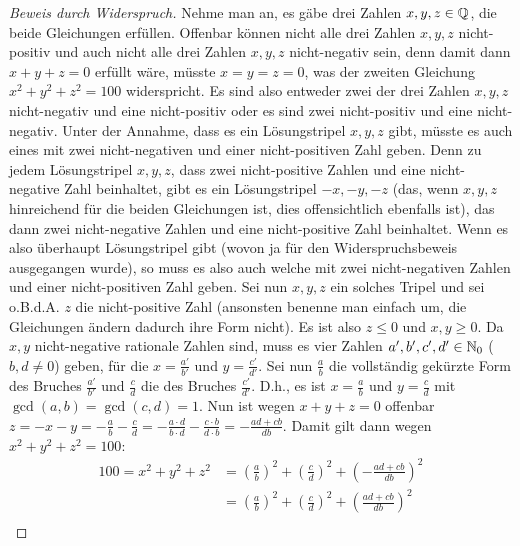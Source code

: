 \begin{proof}[Beweis durch Widerspruch]
    Nehme man an, es gäbe drei Zahlen $x, y, z \in \mathbb{Q}$, die beide Gleichungen erfüllen. Offenbar können nicht alle 
    drei Zahlen $x, y, z$ nicht-positiv und auch nicht alle drei Zahlen $x, y, z$ nicht-negativ sein, denn damit 
    dann $x+y+z = 0$ erfüllt wäre, müsste $x = y = z = 0$, was der zweiten Gleichung $x^2+y^2+z^2 = 100$ 
    widerspricht. Es sind also entweder zwei der drei Zahlen $x, y, z$ nicht-negativ und eine nicht-positiv oder es 
    sind zwei nicht-positiv und eine nicht-negativ. Unter der Annahme, dass es ein Lösungstripel $x, y, z$ gibt, 
    müsste es auch eines mit zwei nicht-negativen und einer nicht-positiven Zahl geben. Denn zu jedem Lösungstripel 
    $x, y, z$, dass zwei nicht-positive Zahlen und eine nicht-negative Zahl beinhaltet, gibt es ein Lösungstripel 
    $-x,-y,-z$ (das, wenn $x, y, z$ hinreichend für die beiden Gleichungen ist, dies offensichtlich ebenfalls ist), 
    das dann zwei nicht-negative Zahlen und eine nicht-positive Zahl beinhaltet. Wenn es also überhaupt 
    Lösungstripel gibt (wovon ja für den Widerspruchsbeweis ausgegangen wurde), so muss es also auch welche mit zwei 
    nicht-negativen Zahlen und einer nicht-positiven Zahl geben. Sei nun $x, y, z$ ein solches Tripel und sei 
    o.B.d.A. $z$ die nicht-positive Zahl (ansonsten benenne man einfach um, die Gleichungen ändern dadurch ihre Form 
    nicht). Es ist also $z \leq 0$ und $x, y \geq 0$. Da $x, y$ nicht-negative rationale Zahlen sind, muss es vier 
    Zahlen $a', b', c', d' \in \mathbb{N}_0$ ($b, d \neq 0$) geben, für die $x = \frac{a'}{b'}$ und $y = \frac{c'}{d'}$. 
    Sei nun $\frac{a}{b}$ die vollständig gekürzte Form des Bruches $\frac{a'}{b'}$ und $\frac{c}{d}$ die des 
    Bruches $\frac{c'}{d'}$. D.h., es ist $x = \frac{a}{b}$ und $y = \frac{c}{d}$ mit $\gcd(a, b) = \gcd(c, d) = 1$. 
    Nun ist wegen $x+y+z=0$ offenbar $z = -x-y = -\frac{a}{b} - \frac{c}{d} = -\frac{a \cdot d}{b \cdot d} - 
    \frac{c \cdot b}{d \cdot b} = - \frac{ad+cb}{db}$. Damit gilt dann wegen $x^2+y^2+z^2 = 100$:
    \begin{align*}
        100 = x^2+y^2+z^2 &= \left( \frac{a}{b} \right)^2 + \left( \frac{c}{d} \right)^2 + \left( -\frac{ad+cb}{db} \right)^2\\
        &= \left( \frac{a}{b} \right)^2 + \left( \frac{c}{d} \right)^2 + \left( \frac{ad+cb}{db} \right)^2\\

\end{align*}
\end{proof}
